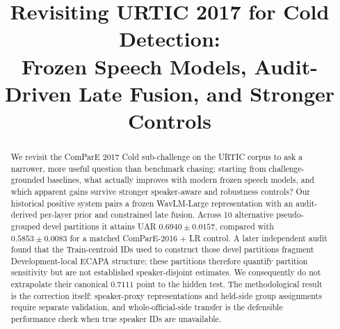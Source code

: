 \documentclass[conference]{IEEEtran}
\title{Revisiting URTIC 2017 for Cold Detection:\\
Frozen Speech Models, Audit-Driven Late Fusion, and Stronger Controls}
\author{\IEEEauthorblockN{Christoph Feldkircher}
\IEEEauthorblockA{Technical University of Munich}
}
\begin{document}
\sloppy
\setlength{\emergencystretch}{3em}
\maketitle
\thispagestyle{empty}

\begin{abstract}
We revisit the ComParE 2017 Cold sub-challenge on the URTIC corpus to ask a narrower, more useful question than benchmark chasing: starting from challenge-grounded baselines, what actually improves with modern frozen speech models, and which apparent gains survive stronger speaker-aware and robustness controls? Our historical positive system pairs a frozen WavLM-Large representation with an audit-derived per-layer prior and constrained late fusion. Across 10 alternative pseudo-grouped devel partitions it attains UAR $0.6940 \pm 0.0157$, compared with $0.5853 \pm 0.0083$ for a matched ComParE-2016 $+$ LR control. A later independent audit found that the Train-centroid IDs used to construct those devel partitions fragment Development-local ECAPA structure; these partitions therefore quantify partition sensitivity but are not established speaker-disjoint estimates. We consequently do not extrapolate their canonical $0.7111$ point to the hidden test. The methodological result is the correction itself: speaker-proxy representations and held-side group assignments require separate validation, and whole-official-side transfer is the defensible performance check when true speaker IDs are unavailable.
\end{abstract}














\end{document}
